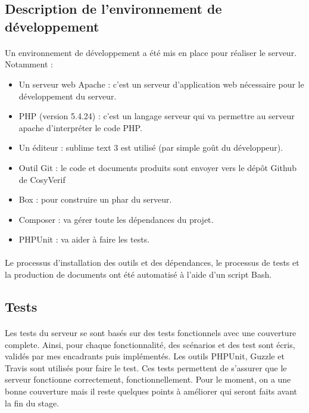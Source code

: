 \documentclass{report}
\begin{document}
\subsection{Description de l'environnement de développement}

\paragraph{}
Un environnement de développement a été mis en place pour réaliser le serveur. Notamment :

\begin{itemize}
\item  Un serveur web Apache : c'est un serveur d'application web nécessaire pour le développement 
du serveur.
\item PHP (version 5.4.24) : c'est un langage serveur qui va permettre au serveur apache d'interpréter le code PHP.
\item Un éditeur : sublime text 3 est utilisé (par simple goût du développeur).
\item Outil Git : le code et documents produits sont envoyer vers le dépôt Github de CosyVerif %
\item Box : pour construire un phar du serveur.
\item Composer : va gérer toute les dépendances du projet.
\item PHPUnit : va aider à faire les tests.
\end{itemize}

\paragraph{}


\paragraph{}
Le processus d'installation des outils et des dépendances, le processus de tests et la production de documents ont été  automatisé à l'aide d'un script Bash.


\subsection{Tests}

\paragraph{}
Les tests du serveur se sont basés sur des tests fonctionnels avec une couverture complete. Ainsi, pour chaque
fonctionnalité, des scénarios et des test sont écris, validés par mes encadrants puis implémentés. Les outils 
PHPUnit, Guzzle et Travis sont utilisés pour faire le test. Ces tests permettent de s'assurer que le serveur 
fonctionne correctement, fonctionnellement. Pour le moment, on a une bonne couverture mais il reste quelques
points à améliorer qui seront faits avant la fin du stage.
\end{document}
